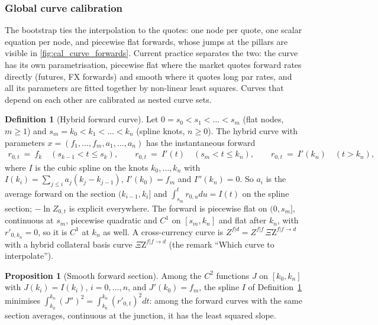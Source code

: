 \documentclass[11pt,english]{amsart}
\newcommand{\QZ}{{\Xi\mathrm{Z}}}
\theoremstyle{definition}
\newtheorem{prop}{Proposition}
\newtheorem{defi}{Definition}
\begin{document}
\subsubsection{Global curve calibration}\label{ssec:cal_global_curves}
The bootstrap ties the interpolation to the quotes: one node per quote, one scalar equation per node, and piecewise flat forwards, whose jumps at the pillars are visible in \autoref{fig:cal_curve_forwards}. Current practice separates the two: the curve has its own parametrisation, piecewise flat where the market quotes forward rates directly (futures, FX forwards) and smooth where it quotes long par rates, and all its parameters are fitted together by non-linear least squares. Curves that depend on each other are calibrated as nested curve sets.

\begin{defi}[Hybrid forward curve]\label{defi:cal_hybrid_curve}
Let $0 = s_0 < s_1 < \ldots < s_m$ (flat nodes, $m\ge1$) and $s_m = k_0 < k_1 < \ldots < k_n$ (spline knots, $n\ge0$). The hybrid curve with parameters $x = (f_1,\ldots,f_m,a_1,\ldots,a_n)$ has the instantaneous forward
\begin{eqnarray*}
  r_{0,t} ~=~ f_k \quad (s_{k-1}<t\le s_k), \qquad r_{0,t} ~=~ I'(t) \quad (s_m < t \le k_n), \qquad r_{0,t} ~=~ I'(k_n) \quad (t > k_n),
\end{eqnarray*}
where $I$ is the cubic spline on the knots $k_0,\ldots,k_n$ with $I(k_i) = \sum_{j\le i} a_j(k_j-k_{j-1})$, $I'(k_0) = f_m$ and $I''(k_n) = 0$. So $a_i$ is the average forward on the section $(k_{i-1},k_i]$ and $\int_{s_m}^t r_{0,u}du = I(t)$ on the spline section; $-\ln Z_{0,t}$ is explicit everywhere. The forward is piecewise flat on $(0,s_m]$, continuous at $s_m$, piecewise quadratic and $C^1$ on $[s_m,k_n]$ and flat after $k_n$, with $r'_{0,k_n} = 0$, so it is $C^1$ at $k_n$ as well. A cross-currency curve is $Z^{f|d} = Z^{f|f}\,\QZ^{f|f\to d}$ with a hybrid collateral basis curve $\QZ^{f|f\to d}$ (the remark ``Which curve to interpolate'').
\end{defi}

\begin{prop}[Smooth forward section]\label{prop:cal_smooth_forward}
Among the $C^2$ functions $J$ on $[k_0,k_n]$ with $J(k_i) = I(k_i)$, $i=0,\ldots,n$, and $J'(k_0) = f_m$, the spline $I$ of Definition~\ref{defi:cal_hybrid_curve} minimises $\int_{k_0}^{k_n}(J'')^2 = \int_{k_0}^{k_n} (r'_{0,t})^2dt$: among the forward curves with the same section averages, continuous at the junction, it has the least squared slope.
\end{prop}
\end{document}
